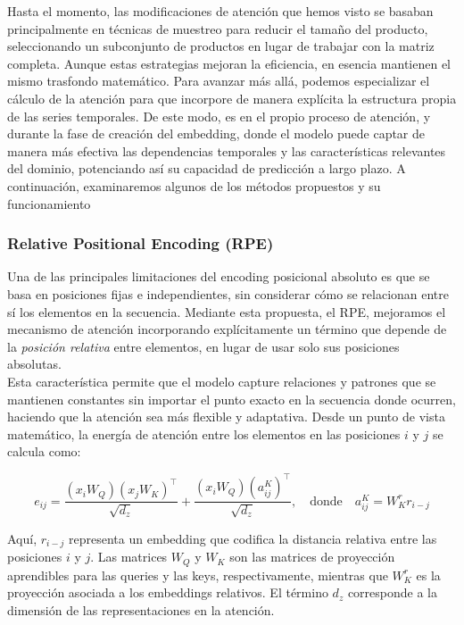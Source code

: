 Hasta el momento, las modificaciones de atención que hemos visto se basaban principalmente en técnicas de muestreo para reducir el tamaño del producto, seleccionando un subconjunto de productos en lugar de trabajar con la matriz completa. Aunque estas estrategias mejoran la eficiencia, en esencia mantienen el mismo trasfondo matemático. Para avanzar más allá, podemos especializar el cálculo de la atención para que incorpore de manera explícita la estructura propia de las series temporales. De este modo, es en el propio proceso de atención, y durante la fase de creación del embedding, donde el modelo puede captar de manera más efectiva las dependencias temporales y las características relevantes del dominio, potenciando así su capacidad de predicción a largo plazo. A continuación, examinaremos algunos de los métodos propuestos y su funcionamiento

\subsubsection{Relative Positional Encoding (RPE)}


Una de las principales limitaciones del encoding posicional absoluto es que se basa en posiciones fijas e independientes, sin considerar cómo se relacionan entre sí los elementos en la secuencia. Mediante esta propuesta, el RPE, mejoramos el mecanismo de atención incorporando explícitamente un término que depende de la \emph{posición relativa} entre elementos, en lugar de usar solo sus posiciones absolutas.\\

Esta característica permite que el modelo capture relaciones y patrones que se mantienen constantes sin importar el punto exacto en la secuencia donde ocurren, haciendo que la atención sea más flexible y adaptativa. Desde un punto de vista matemático, la energía de atención entre los elementos en las posiciones \(i\) y \(j\) se calcula como:


\[
e_{ij} = \frac{(x_i W_Q)(x_j W_K)^\top}{\sqrt{d_z}} + \frac{(x_i W_Q)(a^K_{ij})^\top}{\sqrt{d_z}}, \quad \text{donde} \quad a^K_{ij} = W^r_K r_{i-j}
\]

Aquí, \(r_{i-j}\) representa un embedding que codifica la distancia relativa entre las posiciones \(i\) y \(j\). Las matrices \(W_Q\) y \(W_K\) son las matrices de proyección aprendibles para las queries y las keys, respectivamente, mientras que \(W^r_K\) es la proyección asociada a los embeddings relativos. El término \(d_z\) corresponde a la dimensión de las representaciones en la atención.\\

